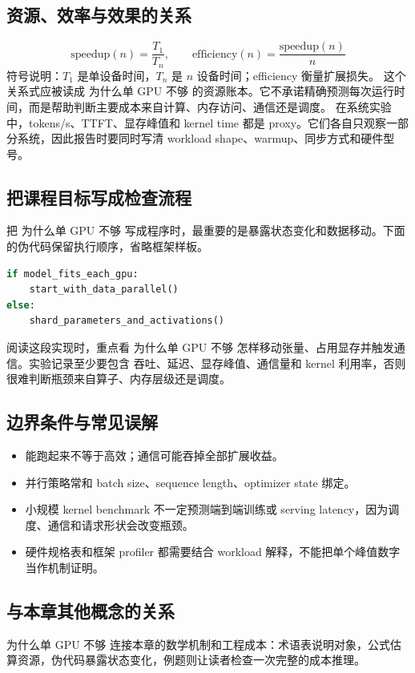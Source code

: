 \documentclass[a4paper]{article}
\begin{document}
\subsection{资源、效率与效果的关系}
\[\text{speedup}(n)=\frac{T_1}{T_n},\qquad \text{efficiency}(n)=\frac{\text{speedup}(n)}{n}\]
符号说明：\(T_1\) 是单设备时间，\(T_n\) 是 \(n\) 设备时间；efficiency 衡量扩展损失。
这个关系式应被读成 为什么单 GPU 不够 的资源账本。它不承诺精确预测每次运行时间，而是帮助判断主要成本来自计算、内存访问、通信还是调度。
在系统实验中，tokens/s、TTFT、显存峰值和 kernel time 都是 proxy。它们各自只观察一部分系统，因此报告时要同时写清 workload shape、warmup、同步方式和硬件型号。
\subsection{把课程目标写成检查流程}
把 为什么单 GPU 不够 写成程序时，最重要的是暴露状态变化和数据移动。下面的伪代码保留执行顺序，省略框架样板。
\begin{lstlisting}[language=Python]
if model_fits_each_gpu:
    start_with_data_parallel()
else:
    shard_parameters_and_activations()
\end{lstlisting}
阅读这段实现时，重点看 为什么单 GPU 不够 怎样移动张量、占用显存并触发通信。实验记录至少要包含 吞吐、延迟、显存峰值、通信量和 kernel 利用率，否则很难判断瓶颈来自算子、内存层级还是调度。
\subsection{边界条件与常见误解}
\begin{itemize}
\item 能跑起来不等于高效；通信可能吞掉全部扩展收益。
\item 并行策略常和 batch size、sequence length、optimizer state 绑定。
\item 小规模 kernel benchmark 不一定预测端到端训练或 serving latency，因为调度、通信和请求形状会改变瓶颈。
\item 硬件规格表和框架 profiler 都需要结合 workload 解释，不能把单个峰值数字当作机制证明。
\end{itemize}
\subsection{与本章其他概念的关系}
为什么单 GPU 不够 连接本章的数学机制和工程成本：术语表说明对象，公式估算资源，伪代码暴露状态变化，例题则让读者检查一次完整的成本推理。
\end{document}
